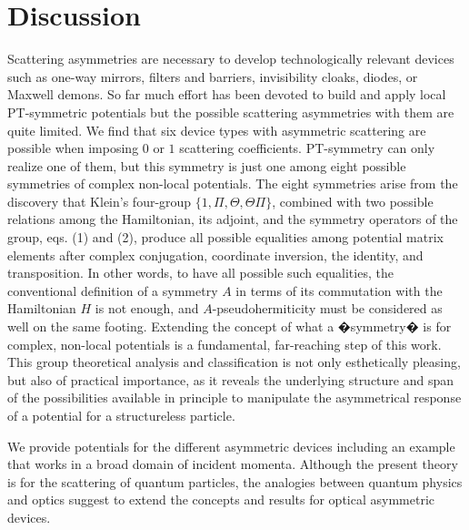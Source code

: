 \section{Discussion}
%
%
Scattering asymmetries are necessary to develop technologically relevant devices such
as one-way mirrors, filters and  barriers, invisibility cloaks, diodes, or Maxwell demons.
So far much effort has been devoted to build and apply local  PT-symmetric potentials but the possible scattering asymmetries with them are
quite limited.
We find that six  device types with asymmetric scattering are possible
when imposing $0$ or $1$ scattering coefficients.
PT-symmetry can only realize one of them, but this symmetry  is just one among eight possible symmetries of complex non-local potentials.
The eight symmetries arise from the discovery that Klein's four-group
$\{1, \Pi, \Theta, \Theta\Pi\}$, combined with two possible relations among the Hamiltonian, its adjoint,
and the symmetry operators of the group, eqs. (1) and (2),
produce all possible  equalities among potential matrix elements after complex conjugation, coordinate inversion, the identity, and transposition.
In other words, to have all possible such equalities, the conventional definition of a symmetry $A$ in terms of its commutation with the Hamiltonian $H$ is not enough, and $A$-pseudohermiticity must be considered as well on the same footing.
Extending the concept of what a �symmetry� is for complex, non-local potentials is
a fundamental, far-reaching step of this work.
This group theoretical analysis and classification is not only esthetically pleasing, but also of practical importance, as it reveals
the underlying structure and span of the possibilities available in principle to manipulate the asymmetrical response of a potential
for a structureless particle.

We provide potentials for the different asymmetric  devices including an example that works
in a broad domain of incident momenta.
%
Although the present theory is for the scattering of quantum particles, the analogies between quantum physics and optics suggest to extend the concepts and results for optical asymmetric devices.


